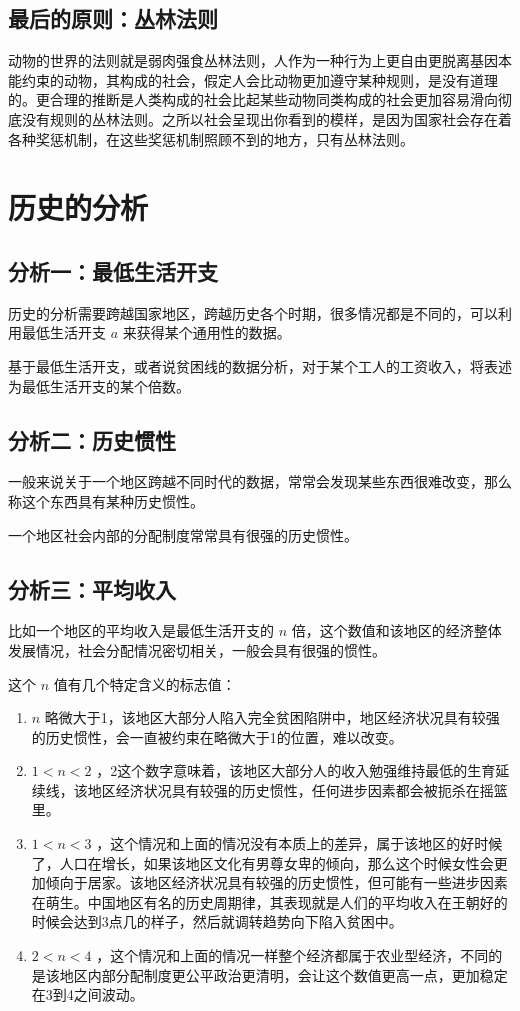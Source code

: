 \documentclass[12pt,oneside]{book}
\begin{document}
\section{最后的原则：丛林法则}

动物的世界的法则就是弱肉强食丛林法则，人作为一种行为上更自由更脱离基因本能约束的动物，其构成的社会，假定人会比动物更加遵守某种规则，是没有道理的。更合理的推断是人类构成的社会比起某些动物同类构成的社会更加容易滑向彻底没有规则的丛林法则。之所以社会呈现出你看到的模样，是因为国家社会存在着各种奖惩机制，在这些奖惩机制照顾不到的地方，只有丛林法则。


\chapter{历史的分析}
\section{分析一：最低生活开支}
历史的分析需要跨越国家地区，跨越历史各个时期，很多情况都是不同的，可以利用最低生活开支 $ a $ 来获得某个通用性的数据。

基于最低生活开支，或者说贫困线的数据分析，对于某个工人的工资收入，将表述为最低生活开支的某个倍数。

\section{分析二：历史惯性}
一般来说关于一个地区跨越不同时代的数据，常常会发现某些东西很难改变，那么称这个东西具有某种历史惯性。

一个地区社会内部的分配制度常常具有很强的历史惯性。


\section{分析三：平均收入}
比如一个地区的平均收入是最低生活开支的 $ n $ 倍，这个数值和该地区的经济整体发展情况，社会分配情况密切相关，一般会具有很强的惯性。

这个 $ n $ 值有几个特定含义的标志值：

\begin{enumerate}
\item $ n $ 略微大于1，该地区大部分人陷入完全贫困陷阱中，地区经济状况具有较强的历史惯性，会一直被约束在略微大于1的位置，难以改变。
\item $ 1< n < 2 $ ，2这个数字意味着，该地区大部分人的收入勉强维持最低的生育延续线，该地区经济状况具有较强的历史惯性，任何进步因素都会被扼杀在摇篮里。
\item $ 1< n < 3 $ ，这个情况和上面的情况没有本质上的差异，属于该地区的好时候了，人口在增长，如果该地区文化有男尊女卑的倾向，那么这个时候女性会更加倾向于居家。该地区经济状况具有较强的历史惯性，但可能有一些进步因素在萌生。中国地区有名的历史周期律，其表现就是人们的平均收入在王朝好的时候会达到3点几的样子，然后就调转趋势向下陷入贫困中。
\item $ 2 <n < 4$ ，这个情况和上面的情况一样整个经济都属于农业型经济，不同的是该地区内部分配制度更公平政治更清明，会让这个数值更高一点，更加稳定在3到4之间波动。
\end{enumerate}
\end{document}
